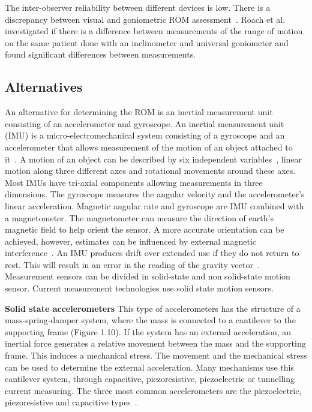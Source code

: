 \documentclass[whitelogo]{tudelft-report}
\begin{document}
{\newline
\newline
The inter-observer reliability between different devices is low. There is a discrepancy between visual and goniometric ROM assessment~\cite{holm2000reliability}. Roach et al.~\cite{roach2013concurrent} investigated if there is a difference between measurements of the range of motion on the same patient done with an inclinometer and universal goniometer and found significant differences between measurements.  

\subsection{Alternatives}
An alternative for determining the ROM is an inertial measurement unit consisting of an accelerometer and gyroscope. An inertial measurement unit (IMU) is a micro-electromechanical system consisting of a gyroscope and an accelerometer that allows measurement of the motion of an object attached to it~\cite{bloomfield2018proposal}. A motion of an object can be described by six independent variables~\cite{zeng2011sensing}, linear motion along three different axes and rotational movements around these axes. Most IMUs have tri-axial components allowing measurements in three dimensions. The gyroscope measures the angular velocity and the accelerometer's linear acceleration. Magnetic angular rate and gyroscope are IMU combined with a magnetometer. The magnetometer can measure the direction of earth's magnetic field to help orient the sensor. A more accurate orientation can be achieved, however, estimates can be influenced by external magnetic interference~\cite{lin2012human}. An IMU produces drift over extended use if they do not return to rest. This will result in an error in the reading of the gravity vector~\cite{bloomfield2018proposal}. Measurement sensors can be divided in solid-state and non solid-state motion sensor. Current measurement technologies use solid state motion sensors.
\newline \cite{bloomfield2018proposal}\cite{charlton2015reliability}\cite{renkawitz2012development}

\textbf{Solid state accelerometers}\newline
This type of accelerometers has the structure of a mass-spring-damper system, where the mass is connected to a cantilever to the supporting frame (Figure 1.10). If the system has an external acceleration, an inertial force generates a relative movement between the mass and the supporting frame. This induces a mechanical stress. The movement and the mechanical stress can be used to determine the external acceleration. Many mechanisms use this cantilever system, through capacitive, piezoresistive, piezoelectric or tunnelling current measuring. The three most common accelerometers are the piezoelectric, piezoresistive and capacitive types~\cite{wong2007clinical}. 

}
\end{document}
